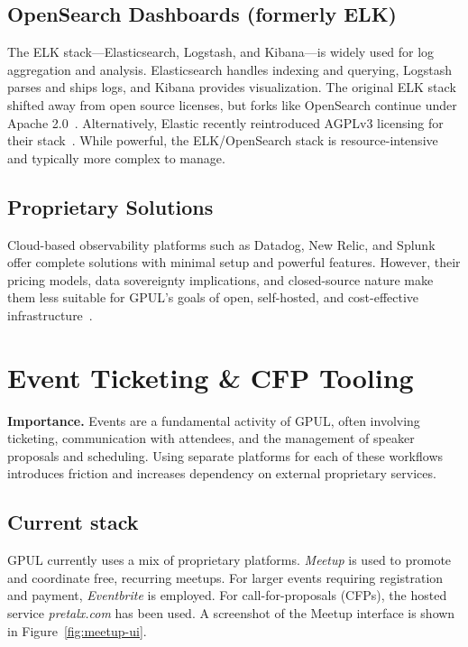 \subsection{OpenSearch Dashboards (formerly ELK)}
The ELK stack—Elasticsearch, Logstash, and Kibana—is widely used for log aggregation and analysis. Elasticsearch handles indexing and querying, Logstash parses and ships logs, and Kibana provides visualization. The original ELK stack shifted away from open source licenses, but forks like OpenSearch continue under Apache 2.0~\cite{opensearch_web}. Alternatively, Elastic recently reintroduced AGPLv3 licensing for their stack~\cite{elastic_license}. While powerful, the ELK/OpenSearch stack is resource-intensive and typically more complex to manage.

\subsection{Proprietary Solutions}
Cloud-based observability platforms such as Datadog, New Relic, and Splunk offer complete solutions with minimal setup and powerful features. However, their pricing models, data sovereignty implications, and closed-source nature make them less suitable for GPUL's goals of open, self-hosted, and cost-effective infrastructure~\cite{datadog_web}.

\section{Event Ticketing \& CFP Tooling}

\textbf{Importance.} Events are a fundamental activity of GPUL, often involving ticketing, communication with attendees, and the management of speaker proposals and scheduling. Using separate platforms for each of these workflows introduces friction and increases dependency on external proprietary services.

\subsection{Current stack}
GPUL currently uses a mix of proprietary platforms. \emph{Meetup} is used to promote and coordinate free, recurring meetups. For larger events requiring registration and payment, \emph{Eventbrite} is employed. For call-for-proposals (CFPs), the hosted service \emph{pretalx.com} has been used. A screenshot of the Meetup interface is shown in Figure~\ref{fig:meetup-ui}.

